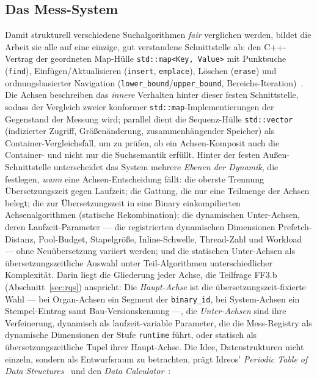 \begin{nurlang}
\section{Das Mess-System}\label{sec:measurement-system}
Damit strukturell verschiedene Suchalgorithmen \emph{fair} verglichen werden, bildet die Arbeit sie alle
auf eine einzige, gut verstandene Schnittstelle ab: den C++-Vertrag der geordneten Map-Hülle
\texttt{std::map<Key,\,Value>} mit Punktsuche (\texttt{find}), Einfügen/Aktualisieren (\texttt{insert},
\texttt{emplace}), Löschen (\texttt{erase}) und ordnungsbasierter Navigation
(\texttt{lower\_bound}/\texttt{upper\_bound}, Bereichs-Iteration)~\cite{iso_cpp}. Die Achsen beschreiben das
\emph{innere} Verhalten hinter dieser festen Schnittstelle, sodass der Vergleich zweier konformer
\texttt{std::map}-Implementierungen der Gegenstand der Messung wird; parallel dient die Sequenz-Hülle
\texttt{std::vector} (indizierter Zugriff, Größenänderung, zusammenhängender Speicher) als
Container-Vergleichsfall, um zu prüfen, ob ein Achsen-Komposit auch die Container- und nicht nur die
Suchsemantik erfüllt. Hinter der festen Außen-Schnittstelle unterscheidet das System mehrere \emph{Ebenen
der Dynamik}, die festlegen, \emph{wann} eine Achsen-Entscheidung fällt: die oberste Trennung
Übersetzungszeit gegen Laufzeit; die Gattung, die nur eine Teilmenge der Achsen belegt; die zur
Übersetzungszeit in eine Binary einkompilierten Achsenalgorithmen (statische Rekombination); die
dynamischen Unter-Achsen, deren Laufzeit-Parameter --- die registrierten dynamischen Dimensionen
Prefetch-Distanz, Pool-Budget, Stapelgröße, Inline-Schwelle, Thread-Zahl und Workload --- ohne
Neuübersetzung variiert werden; und die statischen Unter-Achsen als übersetzungszeitliche
Auswahl unter Teil-Algorithmen unterschiedlicher Komplexität. Darin liegt die Gliederung jeder Achse,
die Teilfrage FF3.b (Abschnitt~\ref{sec:rqs}) anspricht: Die \emph{Haupt-Achse} ist die
übersetzungszeit-fixierte Wahl --- bei Organ-Achsen ein Segment der \texttt{binary\_id}, bei
System-Achsen ein Stempel-Eintrag samt Bau-Versionskennung ---, die \emph{Unter-Achsen} sind ihre
Verfeinerung, dynamisch als laufzeit-variable Parameter, die die Mess-Registry als dynamische
Dimensionen der Stufe \texttt{runtime} führt, oder statisch als übersetzungszeitliche Tupel ihrer
Haupt-Achse. Die Idee,
Datenstrukturen nicht einzeln,
sondern als Entwurfsraum zu betrachten, prägt Idreos' \emph{Periodic Table of Data
Structures}~\cite{idreos2018periodic} und den \emph{Data Calculator}~\cite{idreos2018datacalculator}:

\end{nurlang}
